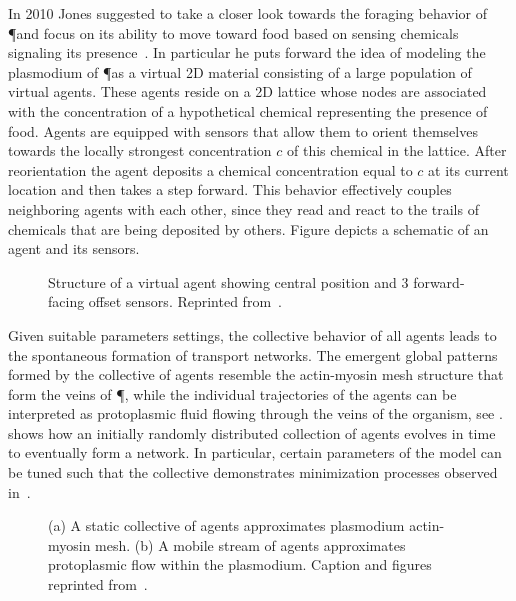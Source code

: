 			In 2010 Jones suggested to take a closer look towards the foraging behavior of \P and focus on its ability to move toward food based on sensing chemicals signaling its presence~\cite{jones2010characteristics}. In particular he puts forward the idea of modeling the plasmodium of \P as a virtual 2D material consisting of a large population of virtual agents. These agents reside on a 2D lattice whose nodes are associated with the concentration of a hypothetical chemical representing the presence of food. Agents are equipped with sensors that allow them to orient themselves towards the locally strongest concentration $c$ of this chemical in the lattice. After reorientation the agent deposits a chemical concentration equal to $c$ at its current location and then takes a step forward. This behavior effectively couples neighboring agents with each other, since they read and react to the trails of chemicals that are being deposited by others. Figure  depicts a schematic of an agent and its sensors.

			\begin{figure}
				\centering
				
				\caption[Multi-agent \P \ - Agent schematic]{Structure of a virtual agent showing central position and $3$ forward-facing offset sensors. Reprinted from~\cite{jones2010characteristics}.}
				\label{fig:agent}
			\end{figure}

			Given suitable parameters settings, the collective behavior of all agents leads to the spontaneous formation of transport networks. The emergent global patterns formed by the collective of agents resemble the actin-myosin mesh structure that form the veins of \P, while the individual trajectories of the agents can be interpreted as protoplasmic fluid flowing through the veins of the organism, see .  shows how an initially randomly distributed collection of agents evolves in time to eventually form a network. In particular, certain parameters of the model can be tuned such that the collective demonstrates minimization processes observed in~\cite{jones2011influences,jones2015applications,baumgarten2015network}. 

			\begin{figure}
				\centering
				
				\caption[Multi-agent \P \ - Collective behavior of agents]{(a) A static collective of agents approximates plasmodium actin-myosin mesh. (b) A mobile stream of agents approximates protoplasmic flow within the plasmodium. Caption and figures reprinted from~\cite{jones2010characteristics}.}
				\label{fig:agent_structures}
			\end{figure}

